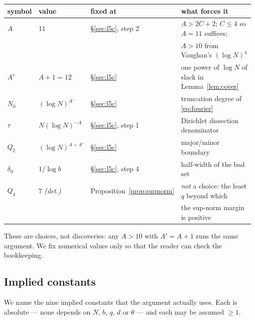 \documentclass[11pt,a4paper]{article}
\theoremstyle{plain}
\theoremstyle{definition}
\theoremstyle{remark}
\begin{document}
\begin{center}
\begin{tabular}{llll}
\toprule
symbol & value & fixed at & what forces it\\
\midrule
$A$ & $11$ & \S\ref{sec:l5c}, step 2 & $A>2C+2$; $C\le4$ so $A=11$ suffices;
  \\ &&& $A>10$ from Vaughan's $(\log N)^{4}$\\
$A'$ & $A+1=12$ & \S\ref{sec:l5c} & one power of $\log N$ of slack in
  Lemma~\ref{lem:cover}\\
$N_0$ & $(\log N)^{A'}$ & \S\ref{sec:l5c} & truncation degree of
  \eqref{eq:fourier}\\
$\tau$ & $N(\log N)^{-A}$ & \S\ref{sec:l5c}, step 1 & Dirichlet dissection
  denominator\\
$Q_2$ & $(\log N)^{A+A'}$ & \S\ref{sec:l5c} & major/minor boundary\\
$\delta_0$ & $1/\log b$ & \S\ref{sec:l5c}, step 4 & half-width of the bad set\\
$Q_4$ & $7$ \emph{(det.)} & Proposition~\ref{prop:supnorm} & \emph{not} a choice: the least $q$
  beyond which\\ &&& the sup-norm margin is positive\\
\bottomrule
\end{tabular}
\end{center}

\noindent
These are choices, not discoveries: any $A>10$ with $A'=A+1$ runs the same
argument. We fix numerical values only so that the reader can check the
bookkeeping.

\subsection{Implied constants}

We name the nine implied constants that the argument actually uses. Each is
absolute --- none depends on $N$, $b$, $q$, $d$ or $\theta$ --- and each may be
assumed $\ge1$.
\end{document}

